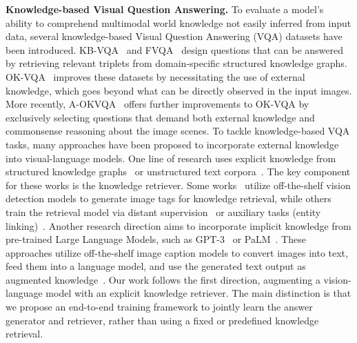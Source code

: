 \documentclass[10pt,twocolumn,letterpaper]{article}
\begin{document}
\noindent \textbf{Knowledge-based Visual Question Answering.}
To evaluate a model's ability to comprehend multimodal world knowledge not easily inferred from input data, several knowledge-based Visual Question Answering (VQA) datasets have been introduced. KB-VQA~\cite{DBLP:conf/ijcai/WangWSDH17} and FVQA~\cite{DBLP:journals/pami/WangWSDH18} design questions that can be answered by retrieving relevant triplets from domain-specific structured knowledge graphs. OK-VQA~\cite{DBLP:conf/cvpr/MarinoRFM19} improves these datasets by necessitating the use of external knowledge, which goes beyond what can be directly observed in the input images.
More recently, A-OKVQA~\cite{DBLP:journals/corr/abs-2206-01718} offers further improvements to OK-VQA by exclusively selecting questions that demand both external knowledge and commonsense reasoning about the image scenes.
To tackle knowledge-based VQA tasks, many approaches have been proposed to incorporate external knowledge into visual-language models. One line of research uses explicit knowledge from structured knowledge graphs~\cite{DBLP:conf/nips/NarasimhanLS18, DBLP:conf/emnlp/GarderesZAL20, DBLP:journals/corr/abs-2205-11501, DBLP:conf/emnlp/HuX0WYZCS22} or unstructured text corpora~\cite{DBLP:conf/cvpr/MarinoCP0R21, DBLP:conf/emnlp/LuoZBB21, DBLP:conf/aaai/WuLSM22}. The key component for these works is the knowledge retriever. Some works~\cite{DBLP:conf/nips/NarasimhanLS18, DBLP:conf/emnlp/GarderesZAL20, DBLP:conf/cvpr/MarinoCP0R21, DBLP:conf/aaai/WuLSM22} utilize off-the-shelf vision detection models to generate image tags for knowledge retrieval, while others train the retrieval model via distant supervision~\cite{DBLP:conf/emnlp/LuoZBB21} or auxiliary tasks (\eg entity linking)~\cite{DBLP:conf/naacl/GuiWH0BG22}. Another research direction aims to incorporate implicit knowledge from pre-trained Large Language Models, such as GPT-3~\cite{DBLP:conf/nips/BrownMRSKDNSSAA20} or PaLM~\cite{DBLP:journals/corr/abs-2204-02311}. These approaches utilize off-the-shelf image caption models to convert images into text, feed them into a language model, and use the generated text output as augmented knowledge~\cite{DBLP:journals/corr/abs-2109-05014, DBLP:conf/naacl/GuiWH0BG22, DBLP:journals/corr/abs-2206-01201}. 
Our work follows the first direction, augmenting a vision-language model with an explicit knowledge retriever. The main distinction is that we propose an end-to-end training framework to jointly learn the answer generator and retriever, rather than using a fixed or predefined knowledge retrieval.
\end{document}
